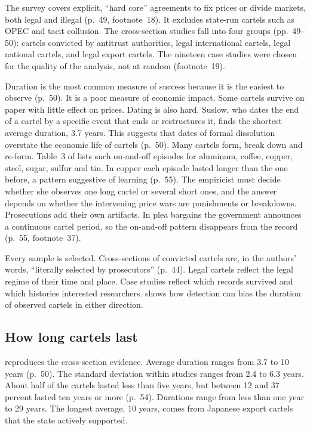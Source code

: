 The survey covers explicit, ``hard core'' agreements to fix prices or divide markets, both legal and illegal
(p.~49, footnote~18). It excludes state-run cartels such as OPEC and tacit collusion. The cross-section studies fall
into four groups (pp.~49--50): cartels convicted by antitrust authorities, legal international cartels, legal
national cartels, and legal export cartels. The nineteen case studies were chosen for the quality of the analysis,
not at random (footnote~19).

Duration is the most common measure of success because it is the easiest to observe (p.~50). It is a poor measure of
economic impact. Some cartels survive on paper with little effect on prices. Dating is also hard. Suslow, who dates
the end of a cartel by a specific event that ends or restructures it, finds the shortest average duration, 3.7 years.
This suggests that dates of formal dissolution overstate the economic life of cartels (p.~50). Many cartels form,
break down and re-form. Table~3 of \citet{LevensteinSuslow2006} lists such on-and-off episodes for aluminum, coffee,
copper, steel, sugar, sulfur and tin. In copper each episode lasted longer than the one before, a pattern suggestive
of learning (p.~55). The empiricist must decide whether she observes one long cartel or several short ones, and the
answer depends on whether the intervening price wars are punishments or breakdowns. Prosecutions add their own
artifacts. In plea bargains the government announces a continuous cartel period, so the on-and-off pattern disappears
from the record (p.~55, footnote~37).

Every sample is selected. Cross-sections of convicted cartels are, in the authors' words, ``literally selected by
prosecutors'' (p.~44). Legal cartels reflect the legal regime of their time and place. Case studies reflect which
records survived and which histories interested researchers.  shows how detection can bias
the duration of observed cartels in either direction.

\subsection{How long cartels last}\label{sec:12-ls-durations}

 reproduces the cross-section evidence. Average duration ranges from 3.7 to 10 years (p.~50).
The standard deviation within studies ranges from 2.4 to 6.3 years. About half of the cartels lasted less than five
years, but between 12 and 37 percent lasted ten years or more (p.~54). Durations range from less than one year to 29
years. The longest average, 10 years, comes from Japanese export cartels that the state actively supported.

